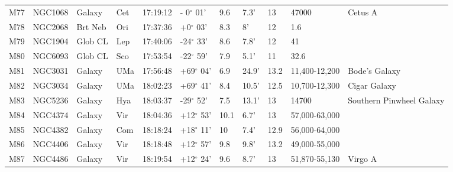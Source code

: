 \documentclass[10pt,twoside,a4paper,english]{article}
\begin{document}
\begin{longtable}{@{}lllllllllll@{}}
M77        & NGC1068     & Galaxy     & Cet       & 17:19:12 & - 0$^{\circ}$ 01'  & 9.6       & 7.3'                 & 13       & 47000               & Cetus A                                   \\ 
M78        & NGC2068     & Brt Neb    & Ori       & 17:37:36 & +0$^{\circ}$ 03'   & 8.3       & 8'                   & 12       & 1.6                 &                                           \\ 
M79        & NGC1904     & Glob CL    & Lep       & 17:40:06 & -24$^{\circ}$ 33'  & 8.6       & 7.8'                 & 12       & 41                  &                                           \\ 
M80        & NGC6093     & Glob CL    & Sco       & 17:53:54 & -22$^{\circ}$ 59'  & 7.9       & 5.1'                 & 11       & 32.6                &                                           \\ 
M81        & NGC3031     & Galaxy     & UMa       & 17:56:48 & +69$^{\circ}$ 04'  & 6.9       & 24.9'                & 13.2     & 11,400-12,200       & Bode's Galaxy                             \\ 
M82        & NGC3034     & Galaxy     & UMa       & 18:02:23 & +69$^{\circ}$ 41'  & 8.4       & 10.5'                & 12.5     & 10,700-12,300       & Cigar Galaxy                              \\ 
M83        & NGC5236     & Galaxy     & Hya       & 18:03:37 & -29$^{\circ}$ 52'  & 7.5       & 13.1'                & 13       & 14700               & Southern Pinwheel Galaxy                  \\ 
M84        & NGC4374     & Galaxy     & Vir       & 18:04:36 & +12$^{\circ}$ 53'  & 10.1      & 6.7'                 & 13       & 57,000-63,000       &                                           \\ 
M85        & NGC4382     & Galaxy     & Com       & 18:18:24 & +18$^{\circ}$ 11'  & 10        & 7.4'                 & 12.9     & 56,000-64,000       &                                           \\ 
M86        & NGC4406     & Galaxy     & Vir       & 18:18:48 & +12$^{\circ}$ 57'  & 9.8       & 9.8'                 & 13.2     & 49,000-55,000       &                                           \\ 
M87        & NGC4486     & Galaxy     & Vir       & 18:19:54 & +12$^{\circ}$ 24'  & 9.6       & 8.7'                 & 13       & 51,870-55,130       & Virgo A                                   \\ 

\end{longtable}
\end{document}
